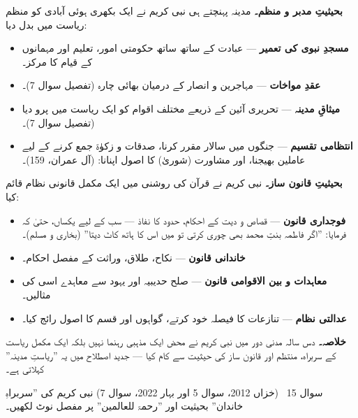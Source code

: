 \begin{hal}
\textbf{بحیثیتِ مدبر و منظم۔} مدینہ پہنچتے ہی نبی کریم \saw نے ایک بکھری
ہوئی آبادی کو منظم ریاست میں بدل دیا:
\begin{itemize}\setlength{\itemsep}{1pt}
  \item \textbf{مسجدِ نبوی کی تعمیر} --- عبادت کے ساتھ ساتھ حکومتی امور،
        تعلیم اور مہمانوں کے قیام کا مرکز۔
  \item \textbf{عقدِ مواخات} --- مہاجرین و انصار کے درمیان بھائی چارہ
        (تفصیل سوال \textenglish{7})۔
  \item \textbf{میثاقِ مدینہ} --- تحریری آئین کے ذریعے مختلف اقوام کو ایک
        ریاست میں پرو دیا (تفصیل سوال \textenglish{7})۔
  \item \textbf{انتظامی تقسیم} --- جنگوں میں سالار مقرر کرنا، صدقات و
        زکوٰۃ جمع کرنے کے لیے عاملین بھیجنا، اور مشاورت (شوریٰ) کا اصول
        اپنانا:  (آل عمران،
        \textenglish{159})۔
\end{itemize}

\medskip
\textbf{بحیثیتِ قانون ساز۔} نبی کریم \saw نے قرآن کی روشنی میں ایک مکمل
قانونی نظام قائم کیا:
\begin{itemize}\setlength{\itemsep}{1pt}
  \item \textbf{فوجداری قانون} --- قصاص و دیت کے احکام، حدود کا نفاذ ---
        سب کے لیے یکساں، حتیٰ کہ فرمایا: ''اگر فاطمہ بنتِ محمد بھی چوری
        کرتی تو میں اس کا ہاتھ کاٹ دیتا'' (بخاری و مسلم)۔
  \item \textbf{خاندانی قانون} --- نکاح، طلاق، وراثت کے مفصل احکام۔
  \item \textbf{معاہدات و بین الاقوامی قانون} --- صلح حدیبیہ اور یہود سے
        معاہدے اسی کی مثالیں۔
  \item \textbf{عدالتی نظام} --- تنازعات کا فیصلہ خود کرتے، گواہوں اور
        قسم کا اصول رائج کیا۔
\end{itemize}

\medskip
\textbf{خلاصہ۔} دس سالہ مدنی دور میں نبی کریم \saw نے محض ایک مذہبی رہنما
نہیں بلکہ ایک مکمل ریاست کے سربراہ، منتظم اور قانون ساز کی حیثیت سے کام
کیا --- جدید اصطلاح میں یہ ''ریاستِ مدینہ'' کہلاتی ہے۔
\end{hal}

\begin{sawal}{سوال \textenglish{15} \ \textnormal{\small(خزاں \textenglish{2012}، سوال \textenglish{5} اور بہار \textenglish{2022}، سوال \textenglish{7})}}
نبی کریم \saw کی ''سربراہِ خاندان'' بحیثیت اور ''رحمۃ للعالمین'' پر مفصل
نوٹ لکھیں۔
\end{sawal}

